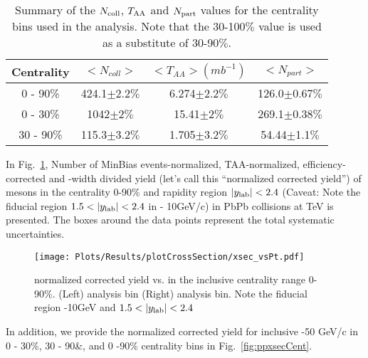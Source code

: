 \begin{table}
\begin{center}
    \begin{tabular}{|c|c|c|c|}
\hline
Centrality & $<N_{coll}>$ & $<T_{AA}> (mb^{-1})$ & $<N_{part}>$ \\
\hline
0 - 90\% & 424.1$\pm$2.2$\%$ & 6.274$\pm$2.2$\%$ & 126.0$\pm$0.67$\%$ \\
\hline
0 - 30\% & 1042$\pm$2$\%$ & 15.41$\pm$2$\%$ & 269.1$\pm$0.38$\%$ \\
\hline
30 - 90\% & 115.3$\pm$3.2$\%$ & 1.705$\pm$3.2$\%$ & 54.44$\pm$1.1$\%$ \\
\hline
    \end{tabular}
\caption{Summary of the $N_{\rm coll}$, $T_{\rm AA}$ and $N_{\rm part}$ values for the centrality bins used in the analysis. Note that the 30-100$\%$ value is used as a substitute of 30-90$\%$.}
\label{tab:TAA}
\end{center}
\end{table}

\fi

In Fig.~\ref{fig:ppxsecpt}, Number of MinBias events-normalized, TAA-normalized, efficiency-corrected and \pt-width divided yield (let's call this ``normalized corrected yield'') of \Bplus mesons in the centrality 0-90\% and rapidity region $\lvert y_\text{lab} \rvert<2.4$ (Caveat: Note the fiducial region $1.5<\lvert y_\text{lab} \rvert<2.4$ in \Bplus {} - 10GeV/c) in PbPb collisions at  TeV is presented. The boxes around the data points represent the total systematic uncertainties.

\begin{figure}[h]
\begin{center}
\texttt{[image: Plots/Results/plotCrossSection/xsec\_vsPt.pdf]}
\caption{\Bplus normalized corrected yield vs. \pt in the inclusive centrality range 0-90\%. (Left) \Bplus analysis \pt bin (Right) \Bs analysis \pt bin. Note the fiducial region -10GeV and $1.5<\lvert y_\text{lab} \rvert<2.4$}
\label{fig:ppxsecpt}
\end{center}
\end{figure}

In addition, we provide the normalized corrected yield for inclusive -50 GeV/c in 0 - 30\%, 30 - 90\&, and 0 -90\% centrality bins in Fig.~\ref{fig:ppxsecCent}.

